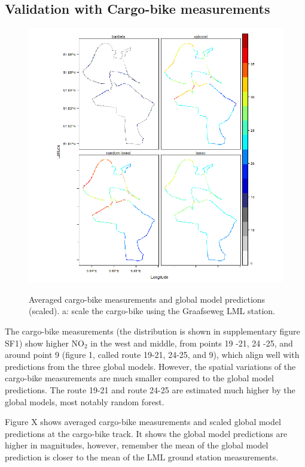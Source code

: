 \documentclass{article}
\begin{document}
\subsection{Validation with Cargo-bike measurements}

\begin{figure}[h!]
    \includegraphics[width=\linewidth]{f4.png}
    \label{seperate}
    \caption {Averaged cargo-bike measurements and global model predictions (scaled). a: scale the cargo-bike using the Graafseweg LML station.}
\end{figure}
The cargo-bike measurements (the distribution is shown in supplementary figure SF1) show higher NO$_2$ in the west and middle, from points 19 -21, 24 -25, and around point 9 (figure 1, called route 19-21, 24-25, and 9), which align well with predictions from the three global models. However, the spatial variations of the cargo-bike measurements are much smaller compared to the global model predictions. The route 19-21 and route 24-25 are estimated much higher by the global models, most notably random forest.    
\par
Figure X shows averaged cargo-bike measurements and scaled global model predictions at the cargo-bike track. It shows the global model predictions are higher in magnitudes, however, remember the mean of the global model prediction is closer to the mean of the LML ground station measurements. 
\end{document}
